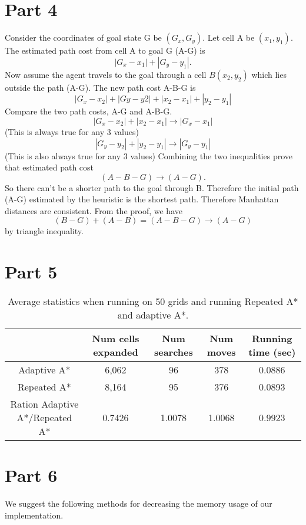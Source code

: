 \documentclass{article}
\begin{document}
\section*{Part 4}
Consider the coordinates of goal state G be $(G_x,G_y)$. Let cell A be $(x_1,y_1)$. The estimated path cost from cell A to goal G (A-G) is $$|G_x-x_1|+|G_y-y_1|.$$ Now assume the agent travels to the goal through a cell $B (x_2,y_2)$ which lies outside the path (A-G). The new path cost A-B-G is $$|G_x- x_2|+|Gy-y2|+|x_2-x_1|+|y_2-y_1|$$
Compare the two path costs, A-G and A-B-G.
\\
$$|G_x-x_2|+|x_2-x_1| \rightarrow  |G_x-x_1|$$(This is always true for any 3 values) $$ |G_y-y_2|+|y_2-y_1|   \rightarrow |G_y-y_1|$$(This is also always true for any 3 values)
Combining the two inequalities prove that estimated path cost $$(A-B-G) \rightarrow (A-G). $$So there can't be a shorter path to the goal through B. Therefore the initial path (A-G) estimated by the heuristic is the shortest path. Therefore Manhattan distances are consistent.
From the proof, we have $$(B-G)+(A-B)=(A-B-G) \rightarrow (A-G)$$  by triangle inequality.

\section*{Part 5}

\begin{table}[h]
  \begin{center}
    \begin{tabular}{|*{5}{c|}}
      \cline{2-5}
      \multicolumn{1}{c|}{} & Num cells expanded & Num searches & Num moves & Running time (sec) \\ \hline
      Adaptive A* & 6,062 & 96 & 378 & 0.0886\\ \hline 
      Repeated A*  & 8,164  & 95 & 376 & 0.0893 \\ \hline \hline
      Ration Adaptive A*/Repeated A* & 0.7426 & 1.0078 & 1.0068 & 0.9923 \\ \hline
    \end{tabular}
  \end{center}
  \caption{Average statistics when running on 50 grids and running Repeated A* and adaptive A*.}
\end{table}

\section*{Part 6}
We suggest the following methods for decreasing the memory usage of our implementation. 
\end{document}
